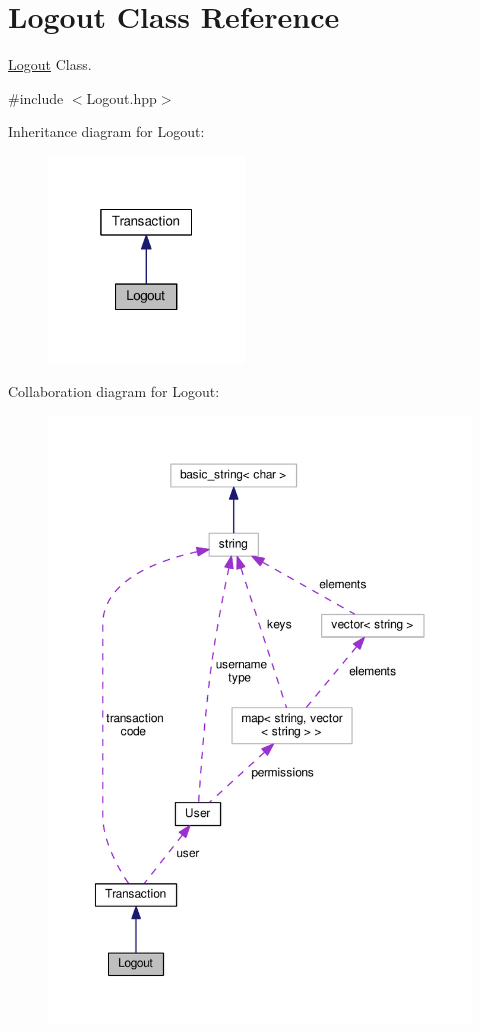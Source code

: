 \hypertarget{class_logout}{\section{Logout Class Reference}
\label{class_logout}
}


\hyperlink{class_logout}{Logout} Class.  




{\ttfamily \#include $<$Logout.\-hpp$>$}



Inheritance diagram for Logout\-:\nopagebreak
\begin{figure}[H]
\begin{center}
\leavevmode
\includegraphics[width=148pt]{class_logout__inherit__graph}
\end{center}
\end{figure}


Collaboration diagram for Logout\-:\nopagebreak
\begin{figure}[H]
\begin{center}
\leavevmode
\includegraphics[width=350pt]{class_logout__coll__graph}
\end{center}
\end{figure}
